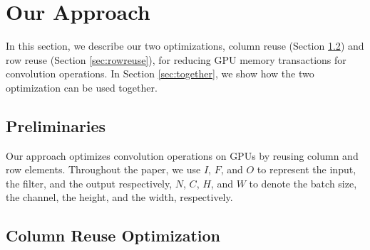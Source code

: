 \section{Our Approach}
\label{sec:strategies} In this section, we describe our two optimizations, column reuse (Section \ref{sec:creuse}) and row reuse (Section
\ref{sec:rowreuse}), for reducing GPU memory transactions for convolution operations. In Section \ref{sec:together}, we show how the two
optimization can be used together. 

\subsection{Preliminaries}

Our approach optimizes convolution operations on GPUs by reusing column and row elements. Throughout the paper, we use $I$, $F$, and $O$ to
represent the input, the filter, and the output respectively, $N$, $C$, $H$, and $W$ to denote the batch size, the channel, the height, and
the width, respectively.

\subsection{Column Reuse Optimization}
\label{sec:creuse}

